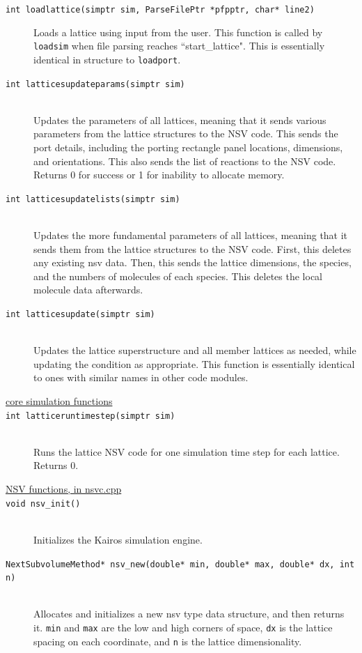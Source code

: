 \documentclass {scrbook}
\newcommand {\ttt} {\texttt}
\begin{document}
\begin{description}
\item[\ttt{int loadlattice(simptr sim, ParseFilePtr *pfpptr, char* line2)}]
Loads a lattice using input from the user. This function is called by \ttt{loadsim} when file parsing reaches ``start\_lattice". This is essentially identical in structure to \ttt{loadport}.

\item[\ttt{int latticesupdateparams(simptr sim)}]
\hfill \\
Updates the parameters of all lattices, meaning that it sends various parameters from the lattice structures to the NSV code. This sends the port details, including the porting rectangle panel locations, dimensions, and orientations. This also sends the list of reactions to the NSV code. Returns 0 for success or 1 for inability to allocate memory.

\item[\ttt{int latticesupdatelists(simptr sim)}]
\hfill \\
Updates the more fundamental parameters of all lattices, meaning that it sends them from the lattice structures to the NSV code. First, this deletes any existing nsv data. Then, this sends the lattice dimensions, the species, and the numbers of molecules of each species. This deletes the local molecule data afterwards.

\item[\ttt{int latticesupdate(simptr sim)}]
\hfill \\
Updates the lattice superstructure and all member lattices as needed, while updating the condition as appropriate. This function is essentially identical to ones with similar names in other code modules.

\item[\underline{core simulation functions}]

\item[\ttt{int latticeruntimestep(simptr sim)}]
\hfill \\
Runs the lattice NSV code for one simulation time step for each lattice. Returns 0.

\item[\underline{NSV functions, in nsvc.cpp}]

\item[\ttt{void nsv\_init()}]
\hfill \\
Initializes the Kairos simulation engine.

\item[\ttt{NextSubvolumeMethod* nsv\_new(double* min, double* max, double* dx, int n)}]
\hfill \\
Allocates and initializes a new nsv type data structure, and then returns it. \ttt{min} and \ttt{max} are the low and high corners of space, \ttt{dx} is the lattice spacing on each coordinate, and \ttt{n} is the lattice dimensionality.


\end{description}
\end{document}
